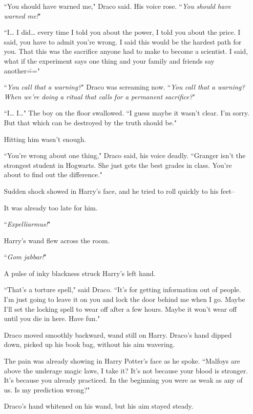 ``You should have warned me," Draco said. His voice rose. ``\emph{You should have warned me!}"

``I{\ldots} I did{\ldots} every time I told you about the power, I told you about the price. I said, you have to admit you're wrong. I said this would be the hardest path for you. That this was the sacrifice anyone had to make to become a scientist. I said, what if the experiment says one thing and your family and friends say another\==="

``\emph{You call that a warning?}" Draco was screaming now. ``\emph{You call that a warning? When we're doing a ritual that calls for a permanent sacrifice?}"

``I{\ldots} I{\ldots}" The boy on the floor swallowed. ``I guess maybe it wasn't clear. I'm sorry. But that which can be destroyed by the truth should be."

Hitting him wasn't enough.

``You're wrong about one thing," Draco said, his voice deadly. ``Granger isn't the strongest student in Hogwarts. She just gets the best grades in class. You're about to find out the difference."

Sudden shock showed in Harry's face, and he tried to roll quickly to his feet\---

It was already too late for him.

``\emph{Expelliarmus!}"

Harry's wand flew across the room.

``\emph{Gom jabbar!}"

A pulse of inky blackness struck Harry's left hand.

``That's a torture spell," said Draco. ``It's for getting information out of people. I'm just going to leave it on you and lock the door behind me when I go. Maybe I'll set the locking spell to wear off after a few hours. Maybe it won't wear off until you die in here. Have fun."

Draco moved smoothly backward, wand still on Harry. Draco's hand dipped down, picked up his book bag, without his aim wavering.

The pain was already showing in Harry Potter's face as he spoke. ``Malfoys are above the underage magic laws, I take it? It's not because your blood is stronger. It's because you already practiced. In the beginning you were as weak as any of us. Is my prediction wrong?"

Draco's hand whitened on his wand, but his aim stayed steady.

